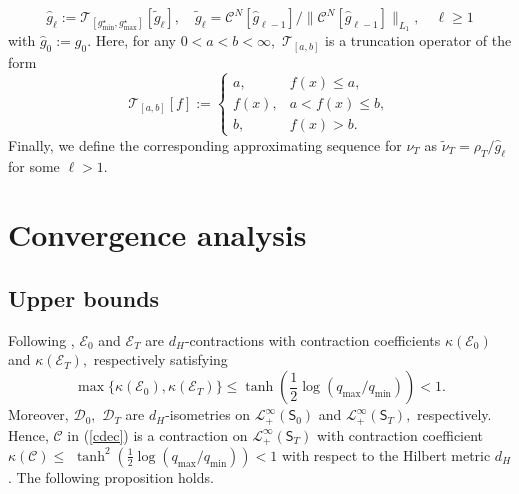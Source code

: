 \documentclass[a4paper,11pt]{amsart}
\theoremstyle{plain}
\theoremstyle{remark}
\begin{document}
\begin{equation}
\label{eq:picar-iter}
\widehat{g}%
_{\ell}:=\mathcal{T}_{[g^{\star}_{\min},g^{\star}_{\max}]}[\widetilde g_\ell], \quad \widetilde g_\ell=\mathcal{C}^{N}[\widehat{g}_{\ell-1}]/\|\mathcal{C}^{N}[\widehat{g}_{\ell-1}]\|_{L_1}, \quad \ell\geq1
\end{equation}
with  $\widehat{g}_{0}:=g_{0}.$
Here, for any \(0<a<b<\infty, \)  \(\mathcal{T}_{[a,b]}\) is a truncation operator of the form
\[
\mathcal{T}_{[a,b]}[f]:=
\begin{cases}
a, & f(x)\leq a,
\\
f(x), & a < f(x) \leq  b,
\\
b,   &  f(x)> b.
\end{cases}
\]
Finally, we define the corresponding approximating sequence 
for \(\nu_T\) as \(\widetilde\nu_{T}=\rho_{T}/\widehat{g}%
_{\ell}\) for some $\ell>1.$

\section{Convergence analysis}\label{sec:conv}
\subsection{Upper bounds}
Following \cite{CGP2016}, $\mathcal{E}_{0}$ and  $\mathcal{E}_{T}$ are $d_H$-contractions
with contraction coefficients \(\kappa(  \mathcal{E}_{0})\) and \(\kappa(  \mathcal{E}_{T}),\) respectively satisfying
\[
\max\{\kappa(  \mathcal{E}_{0}), \kappa(  \mathcal{E}_{T})\} \leq \tanh\left(\frac{1}{2}\log(  q_{\max}/q_{\min})\right)  <1.
\]
 Moreover,
$\mathcal{D}_{0},$ \(\mathcal{D}_{T}\) are $d_H$-isometries on $\mathcal{L}_{+}^{\infty}(\mathsf{S}_{0})$ and $\mathcal{L}_{+}^{\infty}(\mathsf{S}_{T}),$ respectively. Hence, $\mathcal{C}$ in (\ref{cdec}) is a contraction
on $\mathcal{L}_{+}^{\infty}(\mathsf{S}_{T})$ with contraction coefficient $\kappa\left(
\mathcal{C}\right)  \leq$ $\tanh^{2}(\frac{1}{2}\log( q_{\max}/q_{\min} 
)  )<1$ with respect to the Hilbert metric $d_H$. The following proposition holds.
\end{document}

